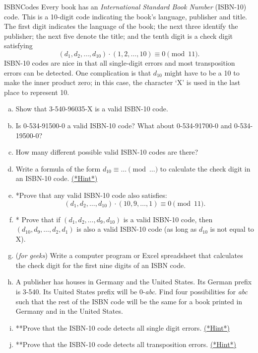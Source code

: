 \begin{exercise}{ISBNCodes}
Every book has an \emph{International Standard Book Number} (ISBN-10) code.  This is a 10-digit code indicating the book's language, publisher and title. The first digit indicates the language of the book; the next three identify the publisher; the next five denote the title; and the tenth digit is a check digit satisfying 
\[
(d_1, d_2, \ldots, d_{10} ) \cdot (1, 2, \ldots, 10 )  \equiv 0 \pmod{11}.
\]
ISBN-10 codes are nice in that all single-digit errors and most transposition errors can be detected.  One complication  is that $d_{10}$ might have to be a 10 to make the inner product zero; in this case, the character `X' is used in the last place to represent 10.

\begin{enumerate}[(a)]
 
\item
Show that 3-540-96035-X is a valid ISBN-10 code. 

\item
Is  0-534-91500-0 a valid ISBN-10 code?  What about 0-534-91700-0 and 0-534-19500-0? 
 
 \item
How many different possible valid ISBN-10 codes are there?

\item
Write a formula of the form $d_{10} \equiv \ldots \pmod{\ldots}$  to calculate the check digit in an ISBN-10 code. 
\hyperref[sec:modular_arithmetic:hints]{(*Hint*)}

\item
*Prove that any valid ISBN-10 code also satisfies:
\[
(d_1, d_2, \ldots, d_{10} ) \cdot (10, 9, \ldots, 1 )  \equiv 0 \pmod{11}.
\]

\item
* Prove that if  $(d_1, d_2, \ldots,d_9,  d_{10} )$ is a valid ISBN-10 code, then $(d_{10}, d_9, \ldots, d_2, d_1 )$  is also a valid ISBN-10 code (as long as $d_{10}$ is not equal to X).
  
 \item
(\emph{for geeks}) Write a computer program or Excel spreadsheet that calculates the check digit for the first nine digits of an ISBN code. 
 
 \item
A publisher has houses in Germany and the United States.  Its German prefix is 3-540.  Its United States prefix will be 0-{\it abc}.  Find four possibilities for {\it abc} such that the rest of the ISBN code will be the same for a book printed in Germany and in the United States.  

\item
**Prove that the ISBN-10 code detects all single digit errors.
\hyperref[sec:modular_arithmetic:hints]{(*Hint*)}

\item
**Prove that the ISBN-10 code detects all transposition errors. 
\hyperref[sec:modular_arithmetic:hints]{(*Hint*)}

\end{enumerate}
\end{exercise}



